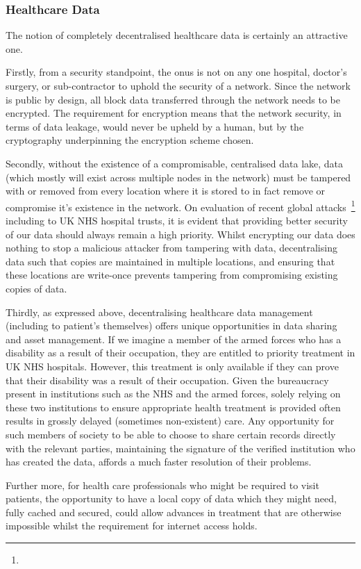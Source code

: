 \subsubsection{Healthcare Data}

The notion of completely decentralised healthcare data is certainly an attractive one.

Firstly, from a security standpoint, the onus is not on any one hospital, doctor's surgery, or sub-contractor to uphold the security of a network. Since the network is public by design, all block data transferred through the network needs to be encrypted. The requirement for encryption means that the network security, in terms of data leakage, would never be upheld by a human, but by the cryptography underpinning the encryption scheme chosen.

Secondly, without the existence of a compromisable, centralised data lake, data (which mostly will exist across multiple nodes in the network) must be tampered with or removed from every location where it is stored to in fact remove or compromise it's existence in the network. On evaluation of recent global attacks~\footnote{
} including to UK NHS hospital trusts, it is evident that providing better security of our data should always remain a high priority. Whilst encrypting our data does nothing to stop a malicious attacker from tampering with data, decentralising data such that copies are maintained in multiple locations, and ensuring that these locations are write-once prevents tampering from compromising existing copies of data.

Thirdly, as expressed above, decentralising healthcare data management (including to patient's themselves) offers unique opportunities in data sharing and asset management.
If we imagine a member of the armed forces who has a disability as a result of their occupation, they are entitled to priority treatment in UK NHS hospitals. However, this treatment is only available if they can prove that their disability was a result of their occupation. Given the bureaucracy present in institutions such as the NHS and the armed forces, solely relying on these two institutions to ensure appropriate health treatment is provided often results in grossly delayed (sometimes non-existent) care. Any opportunity for such members of society to be able to choose to share certain records directly with the relevant parties, maintaining the signature of the verified institution who has created the data, affords a much faster resolution of their problems.

Further more, for health care professionals who might be required to visit patients, the opportunity to have a local copy of data which they might need, fully cached and secured, could allow advances in treatment that are otherwise impossible whilst the requirement for internet access holds.
